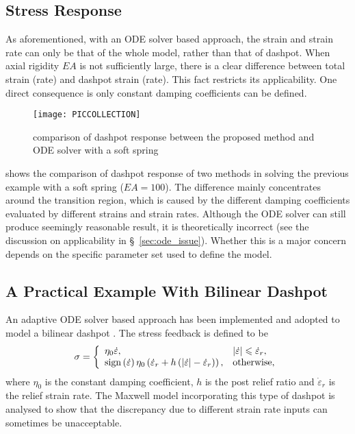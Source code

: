 \subsection{Stress Response}
As aforementioned, with an ODE solver based approach, the strain and strain rate can only be that of the whole model, rather than that of dashpot. When axial rigidity $EA$ is not sufficiently large, there is a clear difference between total strain (rate) and dashpot strain (rate). This fact restricts its applicability. One direct consequence is only constant damping coefficients can be defined.

\begin{figure}[htb]
\centering\scriptsize
\texttt{[image: PICCOLLECTION]}
\caption{comparison of dashpot response between the proposed method and ODE solver with a soft spring}\label{fig:two_method}
\end{figure}
 shows the comparison of dashpot response of two methods in solving the previous example with a soft spring ($EA=100$). The difference mainly concentrates around the transition region, which is caused by the different damping coefficients evaluated by different strains and strain rates. Although the ODE solver can still produce seemingly reasonable result, it is theoretically incorrect (see the discussion on applicability in \S~\ref{sec:ode_issue}). Whether this is a major concern depends on the specific parameter set used to define the model.
\subsection{A Practical Example With Bilinear Dashpot}
An adaptive ODE solver based approach has been implemented and adopted to model a bilinear dashpot \citep{Akcelyan2018}. The stress feedback is defined to be
\begin{gather}
\sigma=\left\{
\begin{array}{ll}
\eta_0\dot\varepsilon,&|\dot\varepsilon|\leqslant\dot\varepsilon_r,\\
\mathrm{sign}\left(\dot\varepsilon\right)\eta_0\left(\dot\varepsilon_r+h\left(|\dot\varepsilon|-\dot\varepsilon_r\right)\right),&\text{otherwise},
\end{array}\right.
\end{gather}
where $\eta_0$ is the constant damping coefficient, $h$ is the post relief ratio and $\dot\varepsilon_r$ is the relief strain rate. The Maxwell model incorporating this type of dashpot is analysed to show that the discrepancy due to different strain rate inputs can sometimes be unacceptable.

